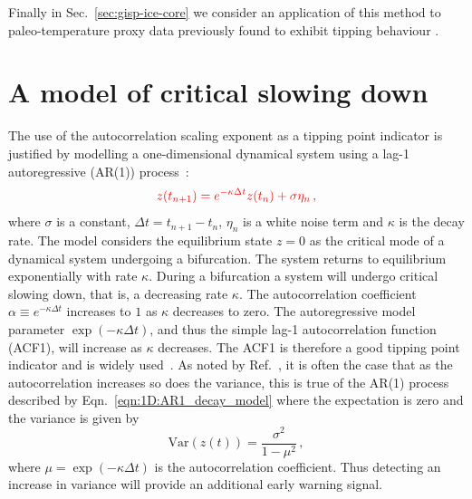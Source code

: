\documentclass[10pt]{iopart}
\newcommand{\revision}[1]{\color{red} {#1}}
\begin{document}
Finally in Sec.~\ref{sec:gisp-ice-core} we consider an application of this method to paleo-temperature proxy data previously found to exhibit tipping behaviour \cite{lenton2012climate}.

\section{A model of critical slowing down}
\label{sec:modellingCSD}

The use of the autocorrelation scaling exponent as a tipping point indicator is justified by modelling a one-dimensional dynamical system using a lag-1 autoregressive (AR(1)) process~\cite{held2004, scheffer2009}:
\begin{equation}
	\label{eqn:1D:AR1_decay_model}
	{\revision z(t_{n+1}) = e^{-\kappa\Delta t}z(t_{n}) + \sigma\eta_n \,, }
\end{equation}
{\revision where $\sigma$ is a constant, $\Delta t = t_{n+1} - t_n$, $\eta_n$ is a white noise term and $\kappa$ is the decay rate.} The model considers the equilibrium state $z=0$ as the critical mode of a dynamical system undergoing a bifurcation. The system returns to equilibrium exponentially with rate $\kappa$. During a bifurcation a system will undergo critical slowing down, that is, a decreasing rate $\kappa$. The autocorrelation coefficient $\alpha \equiv e^{-\kappa\Delta t}$ increases to $1$ as $\kappa$ decreases to zero. The autoregressive model parameter $\exp(-\kappa\Delta t)$, and thus the simple lag-1 autocorrelation function (ACF1), will increase as $\kappa$ decreases. The ACF1 is therefore a good tipping point indicator and is widely used~\cite{held2004,lenton2012}. As noted by Ref.~\cite{scheffer2009}, it is often the case that as the autocorrelation increases so does the variance, this is true of the AR(1) process described by Eqn.~\ref{eqn:1D:AR1_decay_model} where the expectation is zero and the variance is given by
\begin{equation}
	\textrm{Var}(z(t)) = \frac{\sigma^2}{1-\mu^2}\,,
\end{equation} 
where $\mu=\exp(-\kappa\Delta t)$ is the autocorrelation coefficient. Thus detecting an increase in variance will provide an additional early warning signal.
\end{document}
